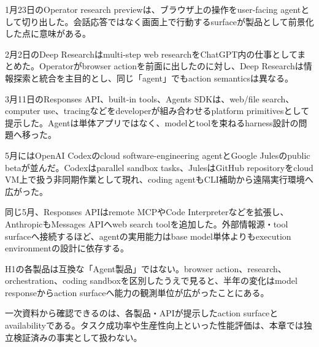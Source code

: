 
1月23日のOperator research previewは、ブラウザ上の操作をuser-facing agentとして切り出した。会話応答ではなく画面上で行動するsurfaceが製品として前景化した点に意味がある。\autocite{src-95b210494c88}


2月2日のDeep Researchはmulti-step web researchをChatGPT内の仕事としてまとめた。Operatorがbrowser actionを前面に出したのに対し、Deep Researchは情報探索と統合を主目的とし、同じ「agent」でもaction semanticsは異なる。\autocite{src-8fec3ef3a97d}


3月11日のResponses API、built-in tools、Agents SDKは、web/file search、computer use、tracingなどをdeveloperが組み合わせるplatform primitivesとして提示した。Agentは単体アプリではなく、modelとtoolを束ねるharness設計の問題へ移った。\autocite{src-78593f4b387f}


5月にはOpenAI Codexのcloud software-engineering agentとGoogle Julesのpublic betaが並んだ。Codexはparallel sandbox tasks、JulesはGitHub repositoryをcloud VM上で扱う非同期作業として現れ、coding agentもCLI補助から遠隔実行環境へ広がった。\autocite{src-8b595b787bad,src-e7aef8f1b13b}


同じ5月、Responses APIはremote MCPやCode Interpreterなどを拡張し、AnthropicもMessages APIへweb search toolを追加した。外部情報源・tool surfaceへ接続するほど、agentの実用能力はbase model単体よりもexecution environmentの設計に依存する。\autocite{src-9257c39d4172,src-e31c642d34b6}


H1の各製品は互換な「Agent製品」ではない。browser action、research、orchestration、coding sandboxを区別したうえで見ると、半年の変化はmodel responseからaction surfaceへ能力の観測単位が広がったことにある。\autocite{src-78593f4b387f,src-8fec3ef3a97d,src-95b210494c88,src-e7aef8f1b13b}


\begin{claimboundary}
一次資料から確認できるのは、各製品・APIが提示したaction surfaceとavailabilityである。タスク成功率や生産性向上といった性能評価は、本章では独立検証済みの事実として扱わない。
\end{claimboundary}
